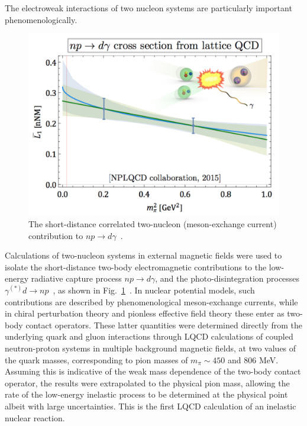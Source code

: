 The electroweak interactions of two nucleon systems are particularly important phenomenologically. 
\begin{figure}
	\centering
	\includegraphics[width=0.95\columnwidth]{figures/npTOdgamma.png}  
	\caption{ 
		The short-distance correlated two-nucleon (meson-exchange current)
		contribution to $np\rightarrow d\gamma$~\protect\cite{Beane:2015yha}.    
	}
	\label{fig:L1bar}
	\vspace*{-0.4cm}
\end{figure}
%
Calculations of two-nucleon systems in external magnetic fields were used to isolate the
short-distance two-body electromagnetic contributions to the low-energy radiative capture process $np\rightarrow d\gamma$,
and the photo-disintegration processes $\gamma^{(*)}d\rightarrow np$~\cite{Beane:2015yha},
as shown in Fig.~\ref{fig:L1bar}~\cite{Beane:2015yha,Detmold:2015daa}.  
In nuclear potential models, such contributions are described by 
phenomenological meson-exchange currents, while in chiral perturbation theory and pionless effective field theory these enter as two-body contact operators. These latter quantities were determined directly from the underlying quark and gluon interactions  through LQCD calculations of coupled neutron-proton systems in multiple background magnetic fields, at two values of the 
quark masses, corresponding to pion masses of $m_\pi\sim 450$ and 806 MeV. Assuming this is indicative of the weak mass dependence of the two-body contact operator, the results were extrapolated to the physical pion mass, allowing the rate of the low-energy inelastic process to be determined 
at the physical point albeit with large uncertainties. 
This is the first LQCD calculation of an inelastic nuclear reaction.



